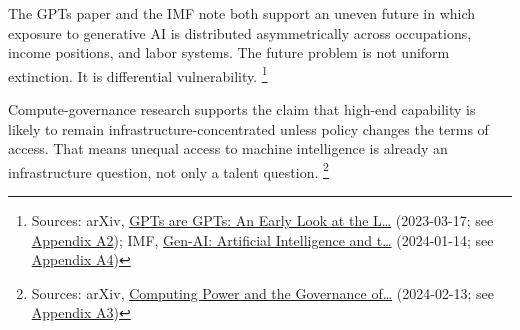 \documentclass[
  american,
  11pt,
  letterpaper,
]{article}
\begin{document}
The GPTs paper and the IMF note both support an uneven future in which
exposure to generative AI is distributed asymmetrically across
occupations, income positions, and labor systems. The future problem is
not uniform extinction. It is differential vulnerability. \footnote{Sources:
  arXiv, \href{https://arxiv.org/abs/2303.10130}{GPTs are GPTs: An Early
  Look at the L\ldots{}} (2023-03-17; see
  \hyperref[appendix-a2-gpts-are-gpts-an-early-look-at-the-labor-market-impact-potential-of-large-language-models]{Appendix
  A2}); IMF,
  \href{https://www.imf.org/en/publications/staff-discussion-notes/issues/2024/01/14/gen-ai-artificial-intelligence-and-the-future-of-work-542379}{Gen-AI:
  Artificial Intelligence and t\ldots{}} (2024-01-14; see
  \hyperref[appendix-a4-gen-ai-artificial-intelligence-and-the-future-of-work]{Appendix
  A4})}

Compute-governance research supports the claim that high-end capability
is likely to remain infrastructure-concentrated unless policy changes
the terms of access. That means unequal access to machine intelligence
is already an infrastructure question, not only a talent question.
\footnote{Sources: arXiv,
  \href{https://arxiv.org/abs/2402.08797}{Computing Power and the
  Governance of\ldots{}} (2024-02-13; see
  \hyperref[appendix-a3-computing-power-and-the-governance-of-artificial-intelligence]{Appendix
  A3})}
\end{document}
